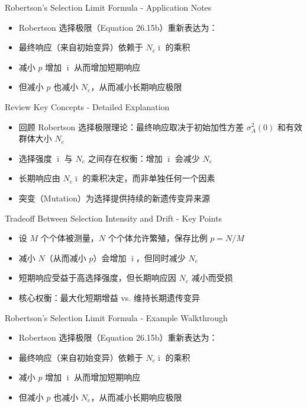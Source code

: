 \documentclass[10pt, aspectratio=169]{ctexbeamer}
\begin{document}
\begin{frame}{Robertson's Selection Limit Formula - Application Notes}
  \begin{itemize}
    \item Robertson 选择极限（Equation 26.15b）重新表达为：
    \item 最终响应（来自初始变异）依赖于 $N_e \bar{\imath}$ 的乘积
    \item 减小 $p$ 增加 $\bar{\imath}$ 从而增加短期响应
    \item 但减小 $p$ 也减小 $N_e$，从而减小长期响应极限
  \end{itemize}
\end{frame}

\begin{frame}{Review Key Concepts - Detailed Explanation}
  \begin{itemize}
    \item 回顾 Robertson 选择极限理论：最终响应取决于初始加性方差 $\sigma_A^2(0)$ 和有效群体大小 $N_e$
    \item 选择强度 $\bar{\imath}$ 与 $N_e$ 之间存在权衡：增加 $\bar{\imath}$ 会减少 $N_e$
    \item 长期响应由 $N_e \bar{\imath}$ 的乘积决定，而非单独任何一个因素
    \item 突变（Mutation）为选择提供持续的新遗传变异来源
  \end{itemize}
\end{frame}

\begin{frame}{Tradeoff Between Selection Intensity and Drift - Key Points}
  \begin{itemize}
    \item 设 $M$ 个个体被测量，$N$ 个个体允许繁殖，保存比例 $p = N/M$
    \item 减小 $N$（从而减小 $p$）会增加 $\bar{\imath}$，但同时减少 $N_e$
    \item 短期响应受益于高选择强度，但长期响应因 $N_e$ 减小而受损
    \item 核心权衡：最大化短期增益 vs. 维持长期遗传变异
  \end{itemize}
\end{frame}

\begin{frame}{Robertson's Selection Limit Formula - Example Walkthrough}
  \begin{itemize}
    \item Robertson 选择极限（Equation 26.15b）重新表达为：
    \item 最终响应（来自初始变异）依赖于 $N_e \bar{\imath}$ 的乘积
    \item 减小 $p$ 增加 $\bar{\imath}$ 从而增加短期响应
    \item 但减小 $p$ 也减小 $N_e$，从而减小长期响应极限
  \end{itemize}
\end{frame}
\end{document}
